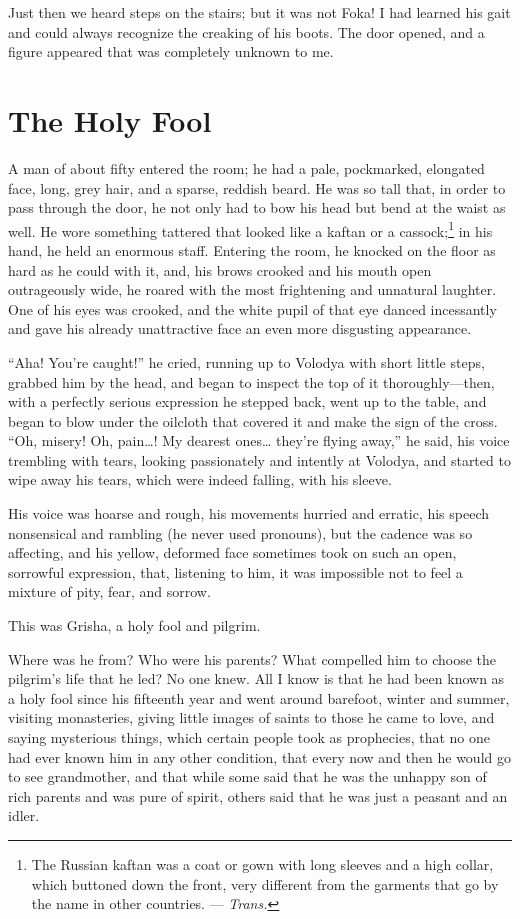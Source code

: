 Just then we heard steps on the stairs; but it was not Foka! I had learned his gait and could always recognize the creaking of his boots. The door opened, and a figure appeared that was completely unknown to me.

\chapter{The Holy Fool} %

A man of about fifty entered the room; he had a pale, pockmarked, elongated face, long, grey hair, and a sparse, reddish beard. He was so tall that, in order to pass through the door, he not only had to bow his head but bend at the waist as well. He wore something tattered that looked like a kaftan or a cassock;\footnote{The Russian kaftan was a coat or gown with long sleeves and a high collar, which buttoned down the front, very different from the garments that go by the name in other countries. --- \textit{Trans.}} in his hand, he held an enormous staff. Entering the room, he knocked on the floor as hard as he could with it, and, his brows crooked and his mouth open outrageously wide, he roared with the most frightening and unnatural laughter. One of his eyes was crooked, and the white pupil of that eye danced incessantly and gave his already unattractive face an even more disgusting appearance.

``Aha! You're caught!'' he cried, running up to Volodya with short little steps, grabbed him by the head, and began to inspect the top of it thoroughly---then, with a perfectly serious expression he stepped back, went up to the table, and began to blow under the oilcloth that covered it and make the sign of the cross. ``Oh, misery! Oh, pain\ldots{}! My dearest ones\ldots{} they're flying away,'' he said, his voice trembling with tears, looking passionately and intently at Volodya, and started to wipe away his tears, which were indeed falling, with his sleeve. %

His voice was hoarse and rough, his movements hurried and erratic, his speech nonsensical and rambling (he never used pronouns), but the cadence was so affecting, and his yellow, deformed face sometimes took on such an open, sorrowful expression, that, listening to him, it was impossible not to feel a mixture of pity, fear, and sorrow.

This was Grisha, a holy fool and pilgrim.

Where was he from? Who were his parents? What compelled him to choose the pilgrim's life that he led? No one knew. All I know is that he had been known as a holy fool since his fifteenth year and went around barefoot, winter and summer, visiting monasteries, giving little images of saints to those he came to love, and saying mysterious things, which certain people took as prophecies, that no one had ever known him in any other condition, that every now and then he would go to see grandmother, and that while some said that he was the unhappy son of rich parents and was pure of spirit, others said that he was just a peasant and an idler.

